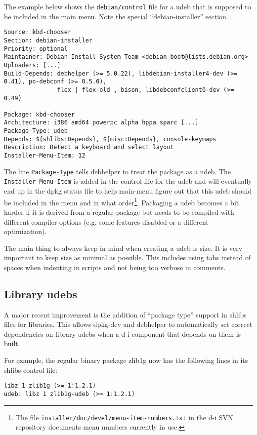 \documentclass[a4paper,10pt]{article}
\begin{document}
The example below shows the \texttt{debian/control} file for a udeb that is supposed to be included in the main menu. Note the special “debian-installer” section.

\begin{verbatim}
Source: kbd-chooser
Section: debian-installer
Priority: optional
Maintainer: Debian Install System Team <debian-boot@lists.debian.org>
Uploaders: [...]
Build-Depends: debhelper (>= 5.0.22), libdebian-installer4-dev (>= 0.41), po-debconf (>= 0.5.0),
               flex | flex-old , bison, libdebconfclient0-dev (>= 0.49)

Package: kbd-chooser
Architecture: i386 amd64 powerpc alpha hppa sparc [...]
Package-Type: udeb
Depends: ${shlibs:Depends}, ${misc:Depends}, console-keymaps
Description: Detect a keyboard and select layout
Installer-Menu-Item: 12
\end{verbatim}

The line \texttt{Package-Type} tells debhelper to treat the package as a udeb. The \texttt{Installer-Menu-Item} is added in the control file for the udeb and will eventually end up in the dpkg status file to help main-menu figure out that this udeb should be included in the menu and in what order\footnote{The file \texttt{installer/doc/devel/menu-item-numbers.txt} in the d-i SVN repository documents menu numbers currently in use.}. Packaging a udeb becomes a bit harder if it is derived from a regular package but needs to be compiled with different compiler options (e.g. some features disabled or a different optimization). 

The main thing to always keep in mind when creating a udeb is size. It is very important to keep size as minimal as possible. This includes using tabs instead of spaces when indenting in scripts and not being too verbose in comments. 


\subsection{Library udebs}
A major recent improvement is the addition of “package type” support in shlibs files for libraries. This allows dpkg-dev and debhelper to automatically set correct dependencies on library udebs when a d-i component that depends on them is built. 

For example, the regular binary package zlib1g now has the following lines in its shlibs control file:

\begin{verbatim}
libz 1 zlib1g (>= 1:1.2.1)
udeb: libz 1 zlib1g-udeb (>= 1:1.2.1)
\end{verbatim}
\end{document}
